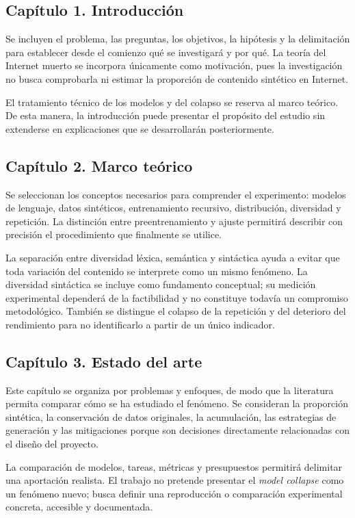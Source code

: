 \documentclass[12pt,letterpaper]{article}
\begin{document}
\subsection*{Capítulo 1. Introducción}
Se incluyen el problema, las preguntas, los objetivos, la hipótesis y la
delimitación para establecer desde el comienzo qué se investigará y por qué.
La teoría del Internet muerto se incorpora únicamente como motivación, pues
la investigación no busca comprobarla ni estimar la proporción de contenido
sintético en Internet.

El tratamiento técnico de los modelos y del colapso se reserva al marco
teórico. De esta manera, la introducción puede presentar el propósito del
estudio sin extenderse en explicaciones que se desarrollarán posteriormente.

\subsection*{Capítulo 2. Marco teórico}
Se seleccionan los conceptos necesarios para comprender el experimento:
modelos de lenguaje, datos sintéticos, entrenamiento recursivo, distribución,
diversidad y repetición. La distinción entre preentrenamiento y ajuste
permitirá describir con precisión el procedimiento que finalmente se utilice.

La separación entre diversidad léxica, semántica y sintáctica ayuda a evitar
que toda variación del contenido se interprete como un mismo fenómeno.
La diversidad sintáctica se incluye como fundamento conceptual; su medición
experimental dependerá de la factibilidad y no constituye todavía un
compromiso metodológico. También se distingue el colapso de la repetición y
del deterioro del rendimiento para no identificarlo a partir de un único
indicador.

\subsection*{Capítulo 3. Estado del arte}
Este capítulo se organiza por problemas y enfoques, de modo que la literatura
permita comparar cómo se ha estudiado el fenómeno. Se consideran la
proporción sintética, la conservación de datos originales, la acumulación,
las estrategias de generación y las mitigaciones porque son decisiones
directamente relacionadas con el diseño del proyecto.

La comparación de modelos, tareas, métricas y presupuestos permitirá
delimitar una aportación realista. El trabajo no pretende presentar el
\textit{model collapse} como un fenómeno nuevo; busca definir una reproducción
o comparación experimental concreta, accesible y documentada.
\end{document}

